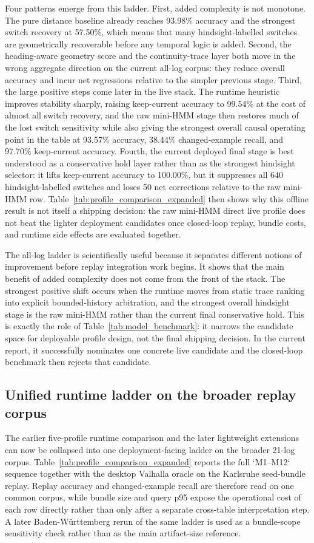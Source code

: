 \documentclass{article}
\begin{document}
Four patterns emerge from this ladder. First, added complexity is not monotone. The pure distance baseline already reaches 93.98\% accuracy and the strongest switch recovery at 57.50\%, which means that many hindsight-labelled switches are geometrically recoverable before any temporal logic is added. Second, the heading-aware geometry score and the continuity-trace layer both move in the wrong aggregate direction on the current all-log corpus: they reduce overall accuracy and incur net regressions relative to the simpler previous stage. Third, the large positive steps come later in the live stack. The runtime heuristic improves stability sharply, raising keep-current accuracy to 99.54\% at the cost of almost all switch recovery, and the raw mini-HMM stage then restores much of the lost switch sensitivity while also giving the strongest overall causal operating point in the table at 93.57\% accuracy, 38.44\% changed-example recall, and 97.70\% keep-current accuracy. Fourth, the current deployed final stage is best understood as a conservative hold layer rather than as the strongest hindsight selector: it lifts keep-current accuracy to 100.00\%, but it suppresses all 640 hindsight-labelled switches and loses 50 net corrections relative to the raw mini-HMM row. Table~\ref{tab:profile_comparison_expanded} then shows why this offline result is not itself a shipping decision: the raw mini-HMM direct live profile does not beat the lighter deployment candidates once closed-loop replay, bundle costs, and runtime side effects are evaluated together.

The all-log ladder is scientifically useful because it separates different notions of improvement before replay integration work begins. It shows that the main benefit of added complexity does not come from the front of the stack. The strongest positive shift occurs when the runtime moves from static trace ranking into explicit bounded-history arbitration, and the strongest overall hindsight stage is the raw mini-HMM rather than the current final conservative hold. This is exactly the role of Table~\ref{tab:model_benchmark}: it narrows the candidate space for deployable profile design, not the final shipping decision. In the current report, it successfully nominates one concrete live candidate and the closed-loop benchmark then rejects that candidate.

\subsection{Unified runtime ladder on the broader replay corpus}
The earlier five-profile runtime comparison and the later lightweight extensions can now be collapsed into one deployment-facing ladder on the broader 21-log corpus. Table~\ref{tab:profile_comparison_expanded} reports the full `M1--M12` sequence together with the desktop Valhalla oracle on the Karlsruhe seed-bundle replay. Replay accuracy and changed-example recall are therefore read on one common corpus, while bundle size and query p95 expose the operational cost of each row directly rather than only after a separate cross-table interpretation step. A later Baden-W\"urttemberg rerun of the same ladder is used as a bundle-scope sensitivity check rather than as the main artifact-size reference.
\end{document}
